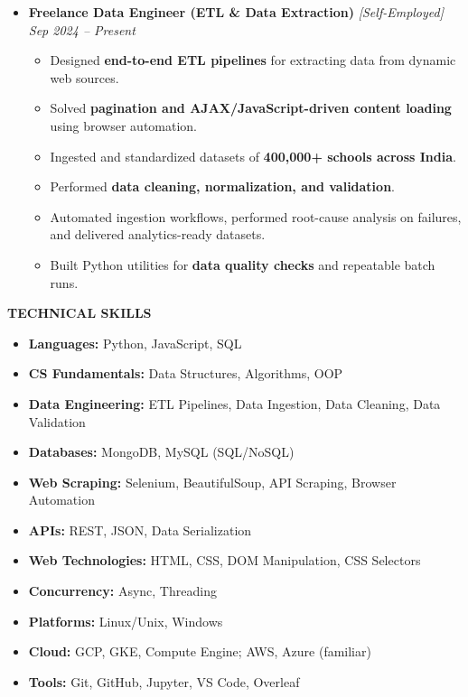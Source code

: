 \documentclass[a4paper,10pt]{article}
\newcommand{\resheading}[1]{{\small \colorbox{mygrey}{\begin{minipage}{0.975\textwidth}{\textbf{#1}}\end{minipage}}}}
\begin{document}
\begin{itemize}

\item {\bf Freelance Data Engineer (ETL \& Data Extraction)} \textit{[Self-Employed]}
\textit{\hfill {Sep 2024 -- Present}}

\begin{itemize}
\item Designed \textbf{end-to-end ETL pipelines} for extracting data from dynamic web sources.
\item Solved \textbf{pagination and AJAX/JavaScript-driven content loading} using browser automation.
\item Ingested and standardized datasets of \textbf{400,000+ schools across India}.
\item Performed \textbf{data cleaning, normalization, and validation}.
\item Automated ingestion workflows, performed root-cause analysis on failures,
and delivered analytics-ready datasets.
\item Built Python utilities for \textbf{data quality checks} and repeatable batch runs.
\end{itemize}

\end{itemize}

\resheading{\textbf{TECHNICAL SKILLS}}

\begin{itemize}
\item \textbf{Languages:} Python, JavaScript, SQL
\item \textbf{CS Fundamentals:} Data Structures, Algorithms, OOP
\item \textbf{Data Engineering:} ETL Pipelines, Data Ingestion, Data Cleaning, Data Validation
\item \textbf{Databases:} MongoDB, MySQL (SQL/NoSQL)
\item \textbf{Web Scraping:} Selenium, BeautifulSoup, API Scraping, Browser Automation
\item \textbf{APIs:} REST, JSON, Data Serialization
\item \textbf{Web Technologies:} HTML, CSS, DOM Manipulation, CSS Selectors
\item \textbf{Concurrency:} Async, Threading
\item \textbf{Platforms:} Linux/Unix, Windows
\item \textbf{Cloud:} GCP, GKE, Compute Engine; AWS, Azure (familiar)
\item \textbf{Tools:} Git, GitHub, Jupyter, VS Code, Overleaf
\end{itemize}
\end{document}
